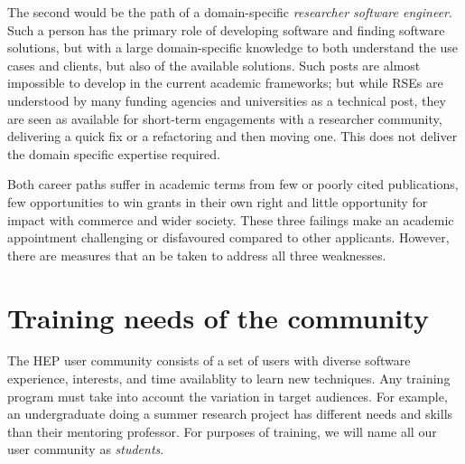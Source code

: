 \documentclass[12pt,a4paper]{article}
\begin{document}
The second would be the path of a domain-specific \emph{researcher software
engineer}. Such a person has the primary role of developing software and finding
software solutions, but with a large domain-specific knowledge to both
understand the use cases and clients, but also of the available solutions.  Such
posts are almost impossible to develop in the current academic frameworks; but
while RSEs are understood by many funding agencies and universities as a
technical post, they are seen as available for short-term engagements with a
researcher community, delivering a quick fix or a refactoring and then moving
one. This does not deliver the domain specific expertise required.

Both career paths suffer in academic terms from few or poorly cited
publications, few opportunities to win grants in their own right and little
opportunity for impact with commerce and wider society. These three failings
make an academic appointment challenging or disfavoured compared to other
applicants. However, there are measures that an be taken to address all three
weaknesses.




\section{Training needs of the community}


The HEP user community consists of a set of users with diverse software
experience, interests, and time availablity to learn new techniques.  Any
training program must take into account the variation in target audiences. For
example, an undergraduate doing a summer research project has different needs
and skills than their mentoring professor. For purposes of training, we will
name all our user community as \emph{students}.
\end{document}
